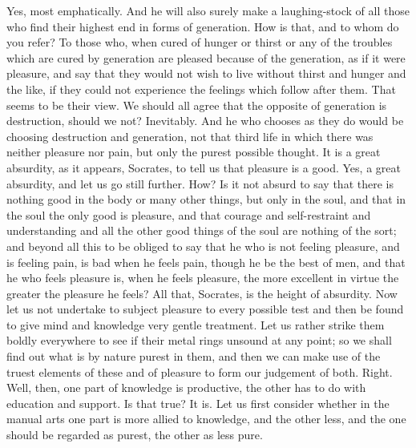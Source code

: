 \documentclass[letterpaper,12pt]{article}
\newcommand{\stephpag}[1]{\marginnote{\small\itshape\fontfamily{ppl}\selectfont #1}}
\begin{document}
\begin{drama}
\protarchusspeaks
Yes, most emphatically.
\socratesspeaks
And he will also surely make a laughing-stock of all those \stephpag{e} who find their highest end in forms of generation.
\protarchusspeaks
How is that, and to whom do you refer?
\socratesspeaks
To those who, when cured of hunger or thirst or any of the troubles which are cured by generation are pleased because of the generation, as if it were pleasure, and say that they would not wish to live without thirst and hunger and the like, if they could not experience the feelings which follow after them. \stephpag{55 a}
\protarchusspeaks
That seems to be their view.
\socratesspeaks
We should all agree that the opposite of generation is destruction, should we not?
\protarchusspeaks
Inevitably.
\socratesspeaks
And he who chooses as they do would be choosing destruction and generation, not that third life in which there was neither pleasure nor pain, but only the purest possible thought.
\protarchusspeaks
It is a great absurdity, as it appears, Socrates, to tell us that pleasure is a good.
\socratesspeaks
Yes, a great absurdity, and let us go still further.
\protarchusspeaks
How? \stephpag{b}
\socratesspeaks
Is it not absurd to say that there is nothing good in the body or many other things, but only in the soul, and that in the soul the only good is pleasure, and that courage and self-restraint and understanding and all the other good things of the soul are nothing of the sort; and beyond all this to be obliged to say that he who is not feeling pleasure, and is feeling pain, is bad when he feels pain, though he be the best of men, and that he who feels pleasure is, \stephpag{c} when he feels pleasure, the more excellent in virtue the greater the pleasure he feels?
\protarchusspeaks
All that, Socrates, is the height of absurdity.
\socratesspeaks
Now let us not undertake to subject pleasure to every possible test and then be found to give mind and knowledge very gentle treatment. Let us rather strike them boldly everywhere to see if their metal rings unsound at any point; so we shall find out what is by nature purest in them, and then we can make use of the truest elements of these and of pleasure to form our judgement of both.
\protarchusspeaks
Right. \stephpag{d}
\socratesspeaks
Well, then, one part of knowledge is productive, the other has to do with education and support. Is that true?
\protarchusspeaks
It is.
\socratesspeaks
Let us first consider whether in the manual arts one part is more allied to knowledge, and the other less, and the one should be regarded as purest, the other as less pure.
\protarchusspeaks

\end{drama}
\end{document}
